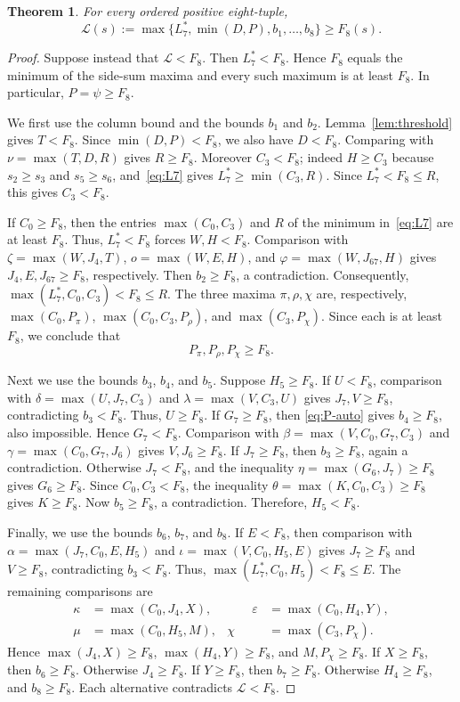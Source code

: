 \documentclass[12pt]{amsart}
\newtheorem{theorem}{Theorem}[section]
\theoremstyle{definition}
\theoremstyle{remark}
\numberwithin{equation}{section}
\numberwithin{figure}{section}
\numberwithin{table}{section}
\newcommand{\F}{F_8}
\newcommand{\omicron}{o}
\newcommand{\Ppi}{P_\pi}
\newcommand{\Prho}{P_\rho}
\newcommand{\Pchi}{P_\chi}
\begin{document}
\begin{theorem}\label{thm:dominate}
For every ordered positive eight-tuple,
\[
\mathcal L(s):=\max\{L_7^*,\min(D,P),b_1,\ldots,b_8\}\ge\F(s).
\]
\end{theorem}
\begin{proof}
Suppose instead that $\mathcal L<\F$. Then $L_7^*<\F$. Hence $\F$ equals the
minimum of the side-sum maxima and every such maximum is at least $\F$. In particular,
$P=\psi\ge\F$.

We first use the column bound and the bounds $b_1$ and $b_2$.
Lemma~\ref{lem:threshold} gives $T<\F$. Since $\min(D,P)<\F$,
we also have $D<\F$. Comparing with $\nu=\max(T,D,R)$ gives $R\ge\F$.
Moreover $C_3<\F$; indeed $H\ge C_3$ because $s_2\ge s_3$ and $s_5\ge s_6$, and~\eqref{eq:L7} gives
$L_7^*\ge\min(C_3,R)$. Since $L_7^*<\F\le R$, this gives $C_3<\F$.

If $C_0\ge\F$, then the entries $\max(C_0,C_3)$ and $R$ of the
minimum in~\eqref{eq:L7} are at least $\F$. Thus, $L_7^*<\F$ forces $W,H<\F$.
Comparison with $\zeta=\max(W,J_4,T)$, $\omicron=\max(W,E,H)$,
and $\varphi=\max(W,J_{67},H)$ gives $J_4,E,J_{67}\ge\F$, respectively. Then $b_2\ge\F$, a contradiction.
Consequently, $\max(L_7^*,C_0,C_3)<\F\le R$.
The three maxima $\pi,\rho,\chi$ are, respectively,
$\max(C_0,\Ppi)$, $\max(C_0,C_3,\Prho)$, and
$\max(C_3,\Pchi)$. Since each is at least $\F$, we conclude that
\begin{equation}\label{eq:P-auto}
\Ppi,\Prho,\Pchi\ge\F.
\end{equation}

Next we use the bounds $b_3$, $b_4$, and $b_5$.
Suppose $H_5\ge\F$. If $U<\F$, comparison with $\delta=\max(U,J_7,C_3)$ and
$\lambda=\max(V,C_3,U)$ gives $J_7,V\ge\F$, contradicting $b_3<\F$. Thus, $U\ge\F$.
If $G_7\ge\F$, then \eqref{eq:P-auto} gives $b_4\ge\F$, also impossible.
Hence $G_7<\F$. Comparison with $\beta=\max(V,C_0,G_7,C_3)$ and
$\gamma=\max(C_0,G_7,J_6)$ gives $V,J_6\ge\F$. If $J_7\ge\F$, then $b_3\ge\F$, again a contradiction. Otherwise $J_7<\F$, and the inequality
$\eta=\max(G_6,J_7)\ge\F$ gives $G_6\ge\F$. Since $C_0,C_3<\F$, the
inequality $\theta=\max(K,C_0,C_3)\ge\F$ gives $K\ge\F$.
Now $b_5\ge\F$, a contradiction. Therefore, $H_5<\F$.

Finally, we use the bounds $b_6$, $b_7$, and $b_8$.
If $E<\F$, then comparison with $\alpha=\max(J_7,C_0,E,H_5)$ and
$\iota=\max(V,C_0,H_5,E)$ gives $J_7\ge\F$ and $V\ge\F$, contradicting $b_3<\F$. Thus,
$\max(L_7^*,C_0,H_5)<\F\le E$. The remaining comparisons are
\[
\begin{aligned}
\kappa&=\max(C_0,J_4,X),&\qquad
\varepsilon&=\max(C_0,H_4,Y),\\
\mu&=\max(C_0,H_5,M),&
\chi&=\max(C_3,\Pchi).
\end{aligned}
\]
Hence $\max(J_4,X)\ge\F$, $\max(H_4,Y)\ge\F$, and $M,\Pchi\ge\F$.
If $X\ge\F$, then $b_6\ge\F$. Otherwise $J_4\ge\F$.
If $Y\ge\F$, then $b_7\ge\F$. Otherwise $H_4\ge\F$, and
$b_8\ge\F$. Each alternative contradicts $\mathcal L<\F$.
\end{proof}
\end{document}
